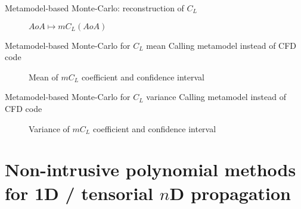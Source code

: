\documentclass[10pt]{beamer}
\newcommand{\lift}{C_L}
\begin{document}
%
%
\begin{frame}{Metamodel-based Monte-Carlo: reconstruction of $\lift$} 
%
\begin{figure}[!h]
\begin{center}
\caption{$AoA\mapsto m\lift(AoA)$}
\end{center}
\end{figure}
%
\end{frame} 
%
%
\begin{frame}{Metamodel-based Monte-Carlo for $\lift$ mean }
{Calling metamodel instead of CFD code} 
%
\begin{figure}[!h]
\begin{center}
\caption{Mean of $m\lift$ coefficient and confidence interval}
\end{center}
\end{figure}
%
\end{frame} 
%
%
\begin{frame}{Metamodel-based Monte-Carlo for $\lift$ variance} 
{Calling metamodel instead of CFD code} 
%
\begin{figure}[!h]
\begin{center}
\caption{Variance of $m\lift$ coefficient and confidence interval}
\end{center}
\end{figure}
%
\end{frame} 
%

\section{Non-intrusive polynomial methods for 1D / tensorial $n$D propagation}
\end{document}
